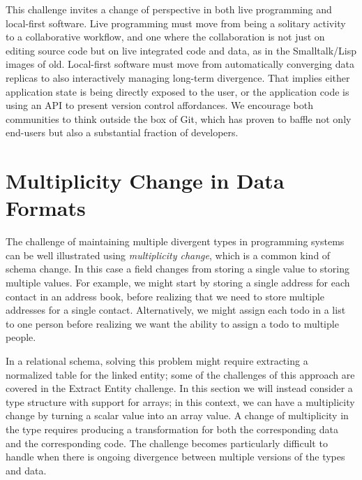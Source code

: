 \documentclass[english,submission]{programming}
\begin{document}
This challenge invites a change of perspective in both live programming and local-first software.
Live programming must move from being a solitary activity to a collaborative workflow, and one
where the collaboration is not just on editing source code but on live integrated code and data,
as in the Smalltalk/Lisp images of old.
Local-first software must move from automatically converging data replicas
to also interactively managing long-term divergence. That implies either application state
is being directly exposed to the user, or the application code is using an API to present
version control affordances. We encourage both communities to think outside the box of Git,
which has proven to baffle not only end-users but also a substantial fraction of developers.


\section{Multiplicity Change in Data Formats}

The challenge of maintaining multiple divergent types in programming systems can
be well illustrated using \emph{multiplicity change}, which is a common kind of schema change.
In this case a field changes from storing
a single value to storing multiple values. For example, we might start by storing a single
address for each contact in an address book, before realizing that we need to store multiple
addresses for a single contact. Alternatively, we might assign each todo in a list to one person before
realizing we want the ability to assign a todo to multiple people.

In a relational schema, solving this problem might require extracting a normalized table for
the linked entity; some of the challenges of this approach are covered in the Extract Entity
challenge. In this section we will instead consider a type structure with support for arrays;
in this context, we can have a multiplicity change by turning a scalar value into an array value.
%
A change of multiplicity in the type requires producing a transformation for both the corresponding
data and the corresponding code. The challenge becomes particularly difficult to handle when there
is ongoing divergence between multiple versions of the types and data.
\end{document}
